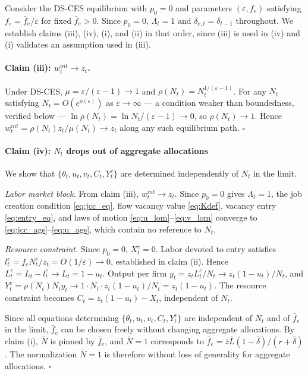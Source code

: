 \documentclass[authoryear, review, 12pt]{elsarticle}
\begin{document}
Consider the DS-CES equilibrium with $p_0=0$ and 
parameters $(\varepsilon, f_e)$ satisfying 
$f_e=\bar{f}_e/\varepsilon$ for fixed $\bar{f}_e>0$. 
Since $p_0=0$, $\Lambda_t=1$ and 
$\delta_{e,t}=\delta_{t-1}$ throughout. We establish 
claims (iii), (iv), (i), and (ii) in that order, 
since (iii) is used in (iv) and (i) validates an 
assumption used in (iii).

\paragraph{Claim (iii): $w_t^{int}\to z_t$.}
Under DS-CES, $\mu=\varepsilon/(\varepsilon-1)\to 1$ 
and $\rho(N_t)=N_t^{1/(\varepsilon-1)}$. For any 
$N_t$ satisfying $N_t = O(e^{o(\varepsilon)})$ as 
$\varepsilon\to\infty$ --- a condition weaker than 
boundedness, verified below --- 
$\ln\rho(N_t) = \ln N_t/(\varepsilon-1)\to 0$, so 
$\rho(N_t)\to 1$. Hence 
$w_t^{int}=\rho(N_t)z_t/\mu(N_t)\to z_t$ along 
any such equilibrium path. $\square$

\paragraph{Claim (iv): $N_t$ drops out of aggregate 
	allocations}

We show that $\{\theta_t, u_t, v_t, C_t, Y_t^c\}$ 
are determined independently of $N_t$ in the limit.

\emph{Labor market block.} From claim (iii), 
$w_t^{int}\to z_t$. Since $p_0=0$ gives $\Lambda_t=1$, 
the job creation condition \eqref{eq:jcc_eq}, flow 
vacancy value \eqref{eq:Kdef}, vacancy entry
\eqref{eq:entry_eq}, and laws of motion
\eqref{eq:u_lom}--\eqref{eq:v_lom} converge to 
\eqref{eq:jcc_ags}--\eqref{eq:u_ags}, which contain 
no reference to $N_t$.

\emph{Resource constraint.} Since $p_0=0$, 
$X_t^c=0$. Labor devoted to entry satisfies 
$l_t^e = f_e N_t^e/z_t = O(1/\varepsilon)\to 0$, 
established in claim (ii). Hence 
$L_t^c = L_t - l_t^e \to L_t = 1-u_t$. 
Output per firm $y_t = z_t L_t^c/N_t \to 
z_t(1-u_t)/N_t$, and $Y_t^c = \rho(N_t)N_t y_t 
\to 1\cdot N_t\cdot z_t(1-u_t)/N_t = z_t(1-u_t)$. 
The resource constraint becomes 
$C_t = z_t(1-u_t)-X_t$, independent of $N_t$.

Since all equations determining
$\{\theta_t,u_t,v_t,C_t,Y_t^c\}$ are independent
of $N_t$ and of $\bar{f}_e$ in the limit, $\bar{f}_e$ can be chosen freely
without changing aggregate allocations. By claim (i), $\bar{N}$ is pinned by
$\bar{f}_e$, and $\bar{N}=1$ corresponds to
$\bar{f}_e=\bar{z}\bar{L}(1-\bar\delta)/(r+\bar\delta)$. The normalization $\bar{N}=1$
is therefore without loss of generality for aggregate allocations. $\square$
\end{document}
